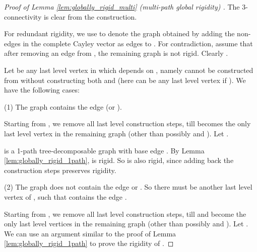 \documentclass[secthm,amsthm,english]{article}
\theoremstyle{definition}
\theoremstyle{remark}
\begin{document}
\begin{proof}[Proof of Lemma \ref{lem:globally_rigid_multi} (multi-path global rigidity) ]
The 3-connectivity is clear from the construction. 

For redundant rigidity, 
we use  to denote the graph obtained by adding the non-edges
in  the complete Cayley vector as edges to . 
For contradiction, assume that after removing an edge  from , 
the remaining graph  is not rigid. 
Clearly .


Let  be any last level vertex in  which depends on , 
namely  cannot be constructed from 
without constructing both  and  (here  can be any last level vertex if ).
We have the following cases:


\noindent (1) The graph  contains the edge  (or ). 

Starting from , 
we remove all last level construction steps, till
 becomes the only last level vertex in the remaining graph 
(other than possibly  and ).
Let . 

 is a 1-path tree-decomposable graph with base edge . 
By Lemma \ref{lem:globally_rigid_1path},  is rigid. 
So  is also rigid, since adding back the construction steps preserves rigidity. 


\noindent (2) The graph  does not contain the edge  or . 
So there must be another last level vertex  of , such that  contains the edge .

Starting from , 
we remove all last level construction steps, till
 and  become the only last level vertices in the remaining graph 
(other than possibly  and ). 
Let . 
We can use an argument similar to the proof of Lemma \ref{lem:globally_rigid_1path} to 
prove the rigidity of .
\end{proof}
\end{document}
